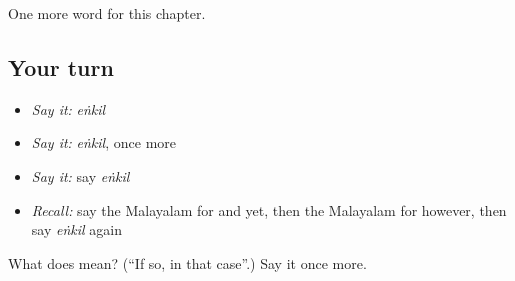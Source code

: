 \begin{grammarlens}[title={What you've built}]
One more word for this chapter.
\end{grammarlens}

\subsection*{Your turn}
\begin{itemize}
\raggedright
  \item \emph{Say it:} \emph{eṅkil}
  \item \emph{Say it:} \emph{eṅkil}, once more
  \item \emph{Say it:} say \emph{eṅkil}
  \item \emph{Recall:} say the Malayalam for and yet, then the Malayalam for however, then say \emph{eṅkil} again
\end{itemize}

\begin{tcolorbox}[breakable,colback=teal!4,colframe=teal!35!black,title={Before you move on}]
What does  mean? (\textquotedblleft{}If so, in that case\textquotedblright{}.) Say it once more.
\end{tcolorbox}
